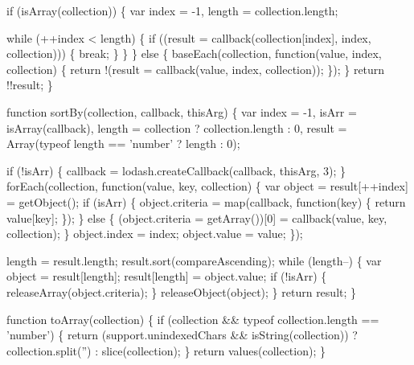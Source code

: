 \begin{DoxyCodeInclude}
      \textcolor{keywordflow}{if} (isArray(collection)) \{
        var index = -1,
            length = collection.length;

        \textcolor{keywordflow}{while} (++index < length) \{
          \textcolor{keywordflow}{if} ((result = callback(collection[index], index, collection))) \{
            \textcolor{keywordflow}{break};
          \}
        \}
      \} \textcolor{keywordflow}{else} \{
        baseEach(collection, \textcolor{keyword}{function}(value, index, collection) \{
          \textcolor{keywordflow}{return} !(result = callback(value, index, collection));
        \});
      \}
      \textcolor{keywordflow}{return} !!result;
    \}

    \textcolor{keyword}{function} sortBy(collection, callback, thisArg) \{
      var index = -1,
          isArr = isArray(callback),
          length = collection ? collection.length : 0,
          result = Array(typeof length == \textcolor{stringliteral}{'number'} ? length : 0);

      \textcolor{keywordflow}{if} (!isArr) \{
        callback = lodash.createCallback(callback, thisArg, 3);
      \}
      forEach(collection, \textcolor{keyword}{function}(value, key, collection) \{
        var \textcolor{keywordtype}{object} = result[++index] = getObject();
        \textcolor{keywordflow}{if} (isArr) \{
          \textcolor{keywordtype}{object}.criteria = map(callback, \textcolor{keyword}{function}(key) \{ \textcolor{keywordflow}{return} value[key]; \});
        \} \textcolor{keywordflow}{else} \{
          (\textcolor{keywordtype}{object}.criteria = getArray())[0] = callback(value, key, collection);
        \}
        \textcolor{keywordtype}{object}.index = index;
        \textcolor{keywordtype}{object}.value = value;
      \});

      length = result.length;
      result.sort(compareAscending);
      \textcolor{keywordflow}{while} (length--) \{
        var \textcolor{keywordtype}{object} = result[length];
        result[length] = \textcolor{keywordtype}{object}.value;
        \textcolor{keywordflow}{if} (!isArr) \{
          releaseArray(\textcolor{keywordtype}{object}.criteria);
        \}
        releaseObject(\textcolor{keywordtype}{object});
      \}
      \textcolor{keywordflow}{return} result;
    \}

    \textcolor{keyword}{function} toArray(collection) \{
      \textcolor{keywordflow}{if} (collection && typeof collection.length == \textcolor{stringliteral}{'number'}) \{
        \textcolor{keywordflow}{return} (support.unindexedChars && isString(collection))
          ? collection.split(\textcolor{stringliteral}{''})
          : slice(collection);
      \}
      \textcolor{keywordflow}{return} values(collection);
    \}


\end{DoxyCodeInclude}
